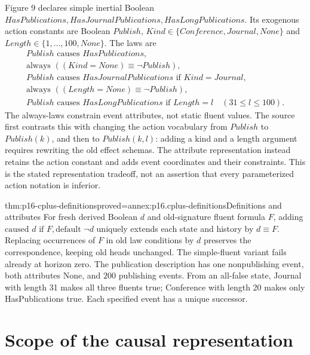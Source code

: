 Figure 9 declares simple inertial Boolean \(HasPublications,
HasJournalPublications,HasLongPublications\).
Its exogenous action constants are Boolean \(Publish\),
\(Kind\in\{Conference,Journal,None\}\) and
\(Length\in\{1,\ldots,100,None\}\).
The laws are
\[
\begin{gathered}
 Publish\text{ causes }HasPublications,\\
 \text{always }((Kind=None)\equiv\neg Publish),\\
 Publish\text{ causes }HasJournalPublications\text{ if }Kind=Journal,\\
 \text{always }((Length=None)\equiv\neg Publish),\\
 Publish\text{ causes }HasLongPublications\text{ if }Length=l
                                      \quad(31\leq l\leq100).
\end{gathered}
\]
The always-laws constrain event attributes, not static fluent values.
The source first contrasts this with changing the action vocabulary from
\(Publish\) to \(Publish(k)\), and then to \(Publish(k,l)\): adding a
kind and a length argument requires rewriting the old effect schemas.
The attribute representation instead retains the action constant and
adds event coordinates and their constraints. This is the stated
representation tradeoff, not an assertion that every parameterized
action notation is inferior.

\begin{hbtheorem}{thm:p16-cplus-definitions}{proved=annex:p16.cplus-definitions}{Definitions and attributes}
For fresh derived Boolean \(d\) and old-signature fluent formula \(F\),
adding \(\text{caused }d\text{ if }F,\text{default }\neg d\)
uniquely extends each state and history by \(d\equiv F\).
Replacing occurrences of \(F\) in old law conditions by \(d\) preserves
the correspondence, keeping old heads unchanged.
The simple-fluent variant fails already at horizon zero.
The publication description has one nonpublishing event, both attributes
None, and \(200\) publishing events.
From an all-false state, Journal with length 31 makes all three fluents
true; Conference with length 20 makes only HasPublications true.
Each specified event has a unique successor.
\end{hbtheorem}

\section{Scope of the causal representation}
\label{sec:p16-cplus-limits}


